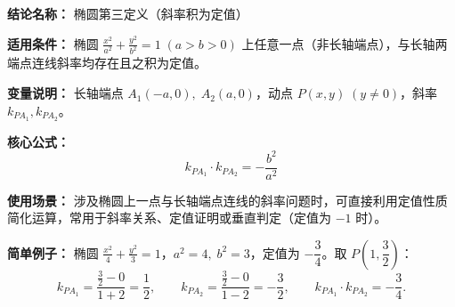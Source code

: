 \textbf{结论名称：} 椭圆第三定义（斜率积为定值）

\textbf{适用条件：} 椭圆 \(\displaystyle \frac{x^{2}}{a^{2}}+\frac{y^{2}}{b^{2}}=1\;(a>b>0)\) 上任意一点（非长轴端点），与长轴两端点连线斜率均存在且之积为定值。

\textbf{变量说明：} 长轴端点 \(A_{1}(-a,0),\;A_{2}(a,0)\)，动点 \(P(x,y)\;(y\neq 0)\)，斜率 \(k_{PA_{1}},k_{PA_{2}}\)。

\textbf{核心公式：}
\[
\boxed{k_{PA_{1}}\cdot k_{PA_{2}}= -\frac{b^{2}}{a^{2}}}
\]

\textbf{使用场景：} 涉及椭圆上一点与长轴端点连线的斜率问题时，可直接利用定值性质简化运算，常用于斜率关系、定值证明或垂直判定（定值为 \(-1\) 时）。

\textbf{简单例子：} 椭圆 \(\displaystyle \frac{x^{2}}{4}+\frac{y^{2}}{3}=1\)，\(a^{2}=4,\;b^{2}=3\)，定值为 \(-\dfrac{3}{4}\)。取 \(P\!\left(1,\dfrac{3}{2}\right)\)：
\[
k_{PA_{1}}=\frac{\frac{3}{2}-0}{1+2}=\frac{1}{2},\qquad 
k_{PA_{2}}=\frac{\frac{3}{2}-0}{1-2}=-\frac{3}{2}, \qquad 
k_{PA_{1}}\cdot k_{PA_{2}}=-\frac{3}{4}.
\]